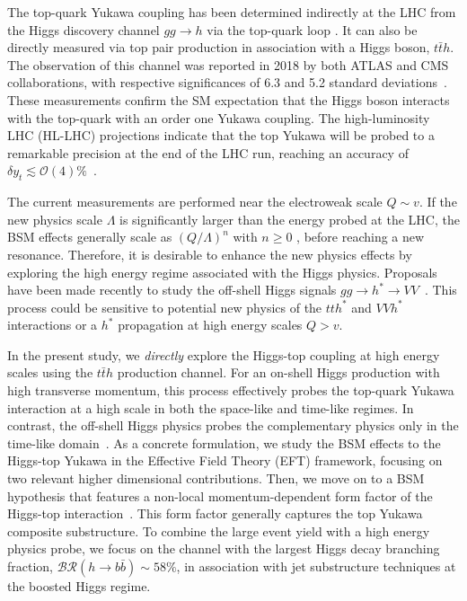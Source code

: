 \documentclass[reprint, aps,prd, preprintnumbers,groupedaddress,nofootinbib]{revtex4-1}
\begin{document}
The top-quark Yukawa coupling has been determined indirectly at the LHC from the Higgs discovery channel $gg\to h$ via the top-quark loop \cite{Aad:2019mbh}. It can also be directly measured via top pair production in association with a Higgs boson, $t\bar{t}h$. The observation of this channel was reported in 2018  by both ATLAS and CMS collaborations, with respective significances of 6.3 and 5.2 standard deviations~\cite{Aaboud:2018urx,Sirunyan:2018hoz}. These measurements confirm the SM expectation that the Higgs boson interacts with the top-quark with an order one Yukawa coupling. The high-luminosity LHC (HL-LHC) projections indicate  that the top Yukawa will be probed to a remarkable precision at the end of the LHC run, reaching an accuracy of $\delta y_t\lesssim\mathcal{O}(4)\%$~\cite{Cepeda:2019klc}.  

The current measurements are performed near the electroweak scale $Q\sim v$. If the new physics scale $\Lambda$ is significantly larger than the energy probed at the LHC, the BSM effects generally scale as $(Q/\Lambda)^n$ with $n\ge 0$ \cite{Appelquist:1974tg,Buchmuller:1985jz,Grzadkowski:2010es}, before reaching a new resonance. Therefore, it is desirable to enhance the new physics effects by exploring the high energy regime associated with the Higgs physics.
Proposals have been made recently to study the off-shell Higgs signals $gg \to h^*\to  VV$~\cite{Azatov:2014jga,Englert:2014aca,Buschmann:2014sia,Corbett:2015ksa,Goncalves:2017iub,Goncalves:2018pkt,Goncalves:2020vyn}. This process could be sensitive to  potential new physics of the $tth^*$ and $VVh^*$ interactions or a $h^*$ propagation at high energy scales $Q > v$.

In the present study, we \emph{directly} explore the Higgs-top coupling at high energy scales using the $t\bar{t}h$ production channel. For an on-shell Higgs production with high transverse momentum, this process effectively probes the top-quark Yukawa interaction at a high scale in both the space-like and time-like regimes. In contrast, the off-shell Higgs physics probes the complementary physics only in the time-like domain~\cite{Goncalves:2017iub,Goncalves:2018pkt,Goncalves:2020vyn}. As a concrete formulation, we study the BSM effects to the Higgs-top Yukawa in the Effective Field Theory (EFT) framework, focusing on two relevant higher dimensional contributions. Then, we move on to a BSM hypothesis that features a non-local momentum-dependent form factor of the  Higgs-top interaction~\cite{Goncalves:2018pkt,Goncalves:2020vyn}. This form 
factor generally captures the top Yukawa composite substructure. To combine the large event yield with a high energy physics probe, we focus on the channel with the largest Higgs decay branching fraction, $\mathcal{BR}(h\to b\bar{b})\sim 58\%$, in association with jet substructure techniques at the boosted Higgs regime. 
\end{document}
